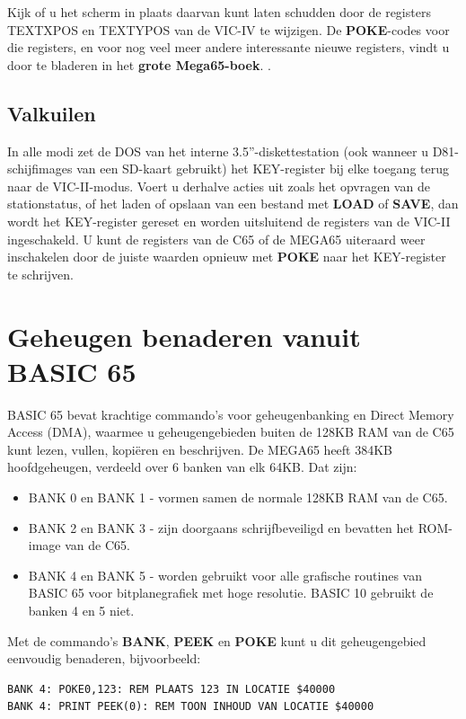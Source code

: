 Kijk of u het scherm in plaats daarvan kunt laten schudden door de registers TEXTXPOS en TEXTYPOS van de VIC-IV te wijzigen. De {\bf POKE}-codes voor die registers, en voor nog veel meer andere interessante nieuwe registers, vindt u door te bladeren in
\ifdefined\printmanual
 het {\bf grote Mega65-boek}.
\else
 .
\fi


\subsection{Valkuilen}

In alle modi zet de DOS van het interne 3.5''-diskettestation (ook wanneer u D81-schijfimages van een SD-kaart gebruikt) het KEY-register bij elke toegang terug naar de VIC-II-modus. Voert u derhalve acties uit zoals het opvragen van de stationstatus, of het laden of opslaan van een bestand met {\bf LOAD} of {\bf SAVE}, dan wordt het KEY-register gereset en worden uitsluitend de registers van de VIC-II ingeschakeld. U kunt de registers van de C65 of de MEGA65 uiteraard weer inschakelen door de juiste waarden opnieuw met {\bf POKE} naar het KEY-register te schrijven.

\section{Geheugen benaderen vanuit BASIC 65}

BASIC 65 bevat krachtige commando's voor geheugenbanking en Direct Memory Access (DMA), waarmee u geheugengebieden buiten de 128KB RAM van de C65 kunt lezen, vullen, kopiëren en beschrijven. De MEGA65 heeft 384KB hoofdgeheugen, verdeeld over 6 banken van elk 64KB. Dat zijn:
\begin{itemize}
 \item BANK 0 en BANK 1 - vormen samen de normale 128KB RAM van de C65. \item BANK 2 en BANK 3 - zijn doorgaans schrijfbeveiligd en bevatten het ROM-image van de C65. \item BANK 4 en BANK 5 - worden gebruikt voor alle grafische routines van BASIC 65 voor bitplanegrafiek met hoge resolutie.       BASIC 10 gebruikt de banken 4 en 5 niet.
\end{itemize}
Met de commando's {\bf BANK}, {\bf PEEK} en {\bf POKE} kunt u dit geheugengebied eenvoudig benaderen, bijvoorbeeld:

\begin{tcolorbox}[colback=black,coltext=white]
\verbatimfont{\codefont}
\begin{verbatim}
BANK 4: POKE0,123: REM PLAATS 123 IN LOCATIE $40000
BANK 4: PRINT PEEK(0): REM TOON INHOUD VAN LOCATIE $40000
\end{verbatim}
\end{tcolorbox}

